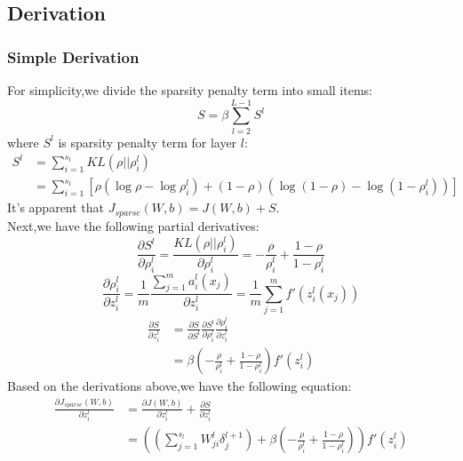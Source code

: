 \documentclass{beamer}
\begin{document}
\begin{CJK*}{UTF8}{gbsn}
\subsection{Derivation}
\begin{frame}[allowframebreaks]\frametitle{Simple Derivation}
For simplicity,we divide the sparsity penalty term into small items:
\begin{equation}
S=\beta\sum_{l=2}^{L-1}S^l
\end{equation}
where $S^l$ is sparsity penalty term for layer $l$:
\begin{equation}
\begin{split}
S^l&=\sum_{i=1}^{s_l}KL(\rho||\rho_i^l)\\
&=\sum_{i=1}^{s_l}\left[\rho(\log\rho-\log\rho_i^l)+(1-\rho)(\log(1-\rho)-\log(1-\rho_i^l))\right]
\end{split}
\end{equation}
It's apparent that $J_{sparse}(W,b)=J(W,b)+S$.\\
Next,we have the following partial derivatives:
\begin{equation}
\frac{\partial S^l}{\partial\rho_i^l}=\frac{KL(\rho||\rho_i^l)}{\partial\rho_i^l}=-\frac{\rho}{\rho_i^l}+\frac{1-\rho}{1-\rho_i^l}
\end{equation}
\begin{equation}
\frac{\partial\rho_i^l}{\partial z_i^l}=\frac{1}{m}\frac{\sum_{j=1}^m a_i^l(x_j)}{\partial z_i^l}=\frac{1}{m}\sum_{j=1}^m f'(z_i^l(x_j))
\end{equation}
\begin{equation}
\begin{split}
\frac{\partial S}{\partial z_i^l}&=\frac{\partial S}{\partial S^l}\frac{\partial S^l}{\partial\rho_i^l}\frac{\partial\rho_i^l}{\partial z_i^l}\\
&=\beta\left(-\frac{\rho}{\rho_i^l}+\frac{1-\rho}{1-\rho_i^l}\right)f'(z_i^l)
\end{split}
\end{equation}
Based on the derivations above,we have the following equation:
\begin{equation}
\begin{split}
\frac{\partial J_{sparse}(W,b)}{\partial z_i^l}&=\frac{\partial J(W,b)}{\partial z_i^l}+\frac{\partial S}{\partial z_i^l}\\
&=\left(\left(\sum_{j=1}^{s_l}W_{ji}^l\delta_j^{l+1}\right)+\beta\left(-\frac{\rho}{\rho_i^l}+\frac{1-\rho}{1-\rho_i^l}\right)\right)f'(z_i^l)
\end{split}
\end{equation}
\end{frame}



\end{CJK*}
\end{document}
